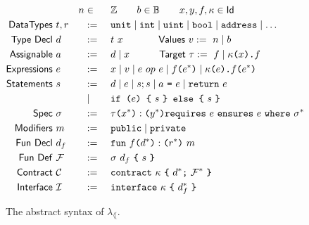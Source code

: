 \begin{figure}
\small
  \begin{alignat*}{3}
    &~ &n & \in && \mathbb{Z} \qquad b \in \mathbb{B} \qquad x,y,f,\K \in \Typ{Id}   \\
    \Typ{Data Types}  &~ t, r && :=\ && \Keywd{unit} \mid \Keywd{int} \mid \Keywd{uint} \mid \Keywd{bool} \mid \Keywd{address} \mid \dots \\
    \Typ{Type~Decl}   &~ d && :=\ && t ~ x \hspace{3.6em}
    \Typ{Values}       ~ v :=\ n \mid b \\
    \Typ{Assignable}  &~ a && :=\ && d \mid x \hspace{3em}
    \Typ{Target}       ~ \tau :=\    f \mid \K \Keywd{(} x \Keywd{).}f \\
    \Typ{Expressions} &~ e && :=\ && x \mid v \mid e ~op~ e %
                                \mid f \texttt{(} e^* \texttt{)}
                                \mid \AddrCall{e}{f}{e^*} \\
    \Typ{Statements}  &~ s && :=\ && d \mid e \mid s; s \mid a ~\Keywd{=}~ e \mid \Keywd{return}~ e \\ %
                      &~   && \mid\ && \Keywd{if (}e\Keywd{) \{}~ s ~\Keywd{\} else \{}~ s ~\Keywd{\}} \\
    \Typ{Spec}        &~ \sigma && :=\ && \SpecCall{\tau}{x^*}{y^*} \SpecCond{e}{e}{\sigma^*} \\
    \Typ{Modifiers}   &~ m && :=\ && \Keywd{public} \mid \Keywd{private} \\
    \Typ{Fun~Decl}    &~ d_f && :=\ && \FunType{f}{d^*}{m}{r^*} \\
    \Typ{Fun~Def}     &~ \F&& :=\ && \sigma ~ d_f ~ \Keywd{\{} ~ s ~ \Keywd{\}} \\
    \Typ{Contract}    &~ \C&& :=\ && \Contract{\K}{d^*}{\F^*} \\
    \Typ{Interface}   &~ \I&& :=\ && \Interface{\K}{d_f^*}
  \end{alignat*}
  \vspace{-1.5em}
  \caption{The abstract syntax of $\lambda_\lang$.}
  \label{fig:syntax}
\end{figure}

